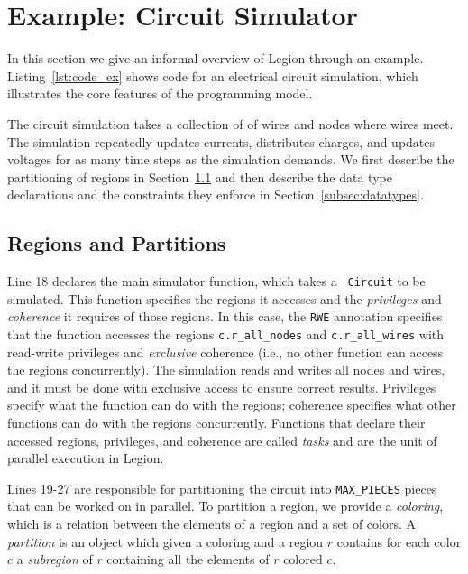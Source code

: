 \section{Example: Circuit Simulator}
\label{sec:ex}

%

In this section we give an informal overview of Legion through an example.
Listing~\ref{lst:code_ex} shows code for an electrical
circuit simulation, which illustrates the core features of the programming model.

The circuit simulation takes a collection of
of wires and nodes where wires meet.  
The simulation repeatedly updates
currents, distributes charges, and updates voltages for as many
time steps as the simulation demands.  We first
describe the partitioning of regions in Section~\ref{subsec:partitioning}
and then describe the data type declarations 
and the constraints they enforce 
in Section~\ref{subsec:datatypes}.

\subsection{Regions and Partitions}
\label{subsec:partitioning}

Line 18 declares the main simulator function, which takes a {\tt
Circuit} to be simulated.  This function specifies the regions it 
accesses and the {\em privileges} and {\em coherence} it requires of those regions.
In this case, the {\tt RWE} annotation specifies that the function
accesses the regions {\tt c.r\_all\_nodes} and {\tt c.r\_all\_wires}
with read-write privileges and {\em exclusive} coherence (i.e., no other
function can access the regions concurrently).  The simulation 
reads and writes all nodes and wires, and it must be done
with exclusive access to ensure correct results.  Privileges specify what
the function can do with the regions; coherence specifies what other
functions can do with the regions concurrently.  Functions that
declare their accessed regions, privileges, and coherence are called {\em tasks}
and are the unit of parallel execution in Legion.

Lines 19-27 are responsible for partitioning the circuit into {\tt MAX\_PIECES}
pieces that can be worked on in parallel.  To partition a region, we
provide a {\em coloring}, which is a relation between the elements
of a region and a set of colors.  A {\em partition} is an object which given
a coloring and a region $r$ contains for each color $c$ a {\em subregion} of $r$
containing all the elements of $r$ colored $c$.

